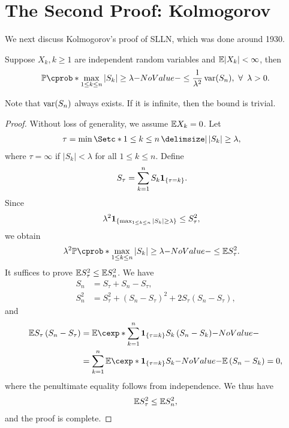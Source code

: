 \documentclass[12pt]{article}
\begin{document}
\section{The Second Proof: Kolmogorov}

We next discuss Kolmogorov's proof of SLLN, which was done around 1930.

\begin{Theorem} \label{wk7:lemma:Kolmogorov_maximal_ineq}
Suppose $X_k, k \geq 1$ are independent random variables and $\E |X_k| < \infty$, then
\begin{align*}
\P(\max_{1 \leq k \leq n} |S_k| \geq \lambda) 
\leq \frac{1}{\lambda^2} \var(S_n),\ \forall\ \lambda > 0.
\end{align*}
\end{Theorem}
Note that $\operatorname{var}(S_n)$ always exists. If it is infinite, then the bound is trivial.
\begin{proof}
Without loss of generality, we assume $\E X_k = 0$. Let
\begin{align*}
&\tau = \min \set*{1 \leq k \leq n \given |S_k| \geq \lambda},
\end{align*}
where $\tau = \infty$ if $|S_k|<\lambda$ for all $1\leq k\leq n$. Define
\begin{align*}
&S_\tau = \sum_{k=1}^n S_k {\bf 1}_{\{\tau = k\}}.
\end{align*}
Since
\begin{align*}
&\lambda^2 {\bf 1}_{\{\max_{1 \leq k \leq n} |S_k| \geq \lambda\}} \leq S_{\tau}^2,
\end{align*}
we obtain
\begin{align*}
&\lambda^2 \P(\max_{1 \leq k \leq n} |S_k| \geq \lambda) \leq \E S_{\tau}^2.
\end{align*}
It suffices to prove $\E S_{\tau}^2 \leq \E S_n^2$. We have
\begin{align*}
S_n &= S_{\tau} + S_n - S_{\tau}, \\
S_n^2 &= S_{\tau}^2 + \left(S_n - S_{\tau}\right)^2 + 2S_{\tau}\left(S_n - S_{\tau}\right),
\end{align*}
and
\begin{align*}
\E S_{\tau}\left(S_n - S_{\tau}\right)
&= \E[\sum_{k=1}^n \indicatore{\{\tau = k\}} S_k\left(S_n - S_k\right)] \\
&= \sum_{k=1}^n \E[\indicatore{\{\tau = k\}} S_k] \E \left(S_n - S_k\right) = 0,
\end{align*}
where the penultimate equality follows from independence. We thus have
\begin{align*}
\E S_{\tau}^2 \leq \E S_n^2,
\end{align*}
and the proof is complete.
\end{proof}
\end{document}
